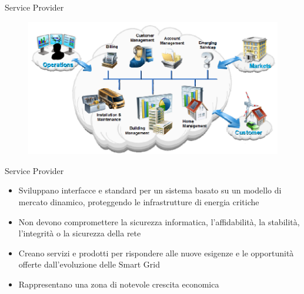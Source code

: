 \begin{frame}[fragile]{Service Provider}
	\begin{figure}[h] 
		\includegraphics[scale=0.45]{imgs/ser.png}
	\end{figure}
\end{frame}

\begin{frame}[fragile]{Service Provider}
	\begin{itemize}[<+- | alert@+>]
		\item Sviluppano interfacce e standard per un sistema basato su un modello di mercato dinamico, proteggendo le infrastrutture di energia critiche   
		\item Non devono compromettere la sicurezza informatica, l'affidabilità, la stabilità, l'integrità o la sicurezza della rete %
		\item Creano servizi e prodotti per rispondere alle nuove esigenze e le opportunità offerte dall'evoluzione delle Smart Grid 
		\item Rappresentano una zona di notevole crescita economica
	\end{itemize}
\end{frame}




